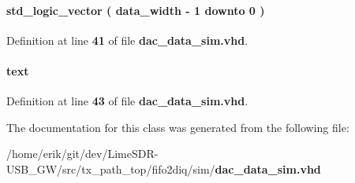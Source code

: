 \paragraph[{B\+Q\+\_\+reg}]{ {\bfseries \textcolor{comment}{std\+\_\+logic\+\_\+vector}\textcolor{vhdlchar}{ }\textcolor{vhdlchar}{(}\textcolor{vhdlchar}{ }\textcolor{vhdlchar}{ }\textcolor{vhdlchar}{ }\textcolor{vhdlchar}{ }{\bfseries {\bf data\+\_\+width}} \textcolor{vhdlchar}{-\/}\textcolor{vhdlchar}{ } \textcolor{vhdldigit}{1} \textcolor{vhdlchar}{ }\textcolor{keywordflow}{downto}\textcolor{vhdlchar}{ }\textcolor{vhdlchar}{ } \textcolor{vhdldigit}{0} \textcolor{vhdlchar}{ }\textcolor{vhdlchar}{)}\textcolor{vhdlchar}{ }} \hspace{0.3cm}{\ttfamily [Signal]}}\label{classdac__data__sim_1_1arch_a49c4ef2c671cb1b1dafab32c9c37ffbd}


Definition at line {\bf 41} of file {\bf dac\+\_\+data\+\_\+sim.\+vhd}.

\paragraph[{fp}]{ {\bfseries \textcolor{vhdlchar}{text}\textcolor{vhdlchar}{ }} \hspace{0.3cm}{\ttfamily [File]}}\label{classdac__data__sim_1_1arch_a2659ff282ca7786f0ef17543598533fa}


Definition at line {\bf 43} of file {\bf dac\+\_\+data\+\_\+sim.\+vhd}.



The documentation for this class was generated from the following file\+:\begin{DoxyCompactItemize}
\item 
/home/erik/git/dev/\+Lime\+S\+D\+R-\/\+U\+S\+B\+\_\+\+G\+W/src/tx\+\_\+path\+\_\+top/fifo2diq/sim/{\bf dac\+\_\+data\+\_\+sim.\+vhd}\end{DoxyCompactItemize}
